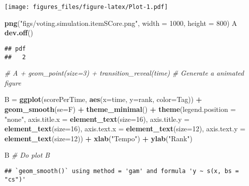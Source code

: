 \documentclass[]{article}
\newenvironment{Shaded}{\begin{snugshade}}{\end{snugshade}}
\newcommand{\CommentTok}[1]{\textcolor[rgb]{0.56,0.35,0.01}{\textit{#1}}}
\newcommand{\DataTypeTok}[1]{\textcolor[rgb]{0.13,0.29,0.53}{#1}}
\newcommand{\DecValTok}[1]{\textcolor[rgb]{0.00,0.00,0.81}{#1}}
\newcommand{\KeywordTok}[1]{\textcolor[rgb]{0.13,0.29,0.53}{\textbf{#1}}}
\newcommand{\NormalTok}[1]{#1}
\newcommand{\OperatorTok}[1]{\textcolor[rgb]{0.81,0.36,0.00}{\textbf{#1}}}
\newcommand{\StringTok}[1]{\textcolor[rgb]{0.31,0.60,0.02}{#1}}
\begin{document}
\texttt{[image: figures\_files/figure-latex/Plot-1.pdf]}

\begin{Shaded}
\begin{Highlighting}[]
\KeywordTok{png}\NormalTok{(}\StringTok{"figs/voting.simulation.itemSCore.png"}\NormalTok{, }\DataTypeTok{width =} \DecValTok{1000}\NormalTok{, }\DataTypeTok{height =} \DecValTok{800}\NormalTok{)}
\NormalTok{A}
\KeywordTok{dev.off}\NormalTok{()}
\end{Highlighting}
\end{Shaded}

\begin{verbatim}
## pdf 
##   2
\end{verbatim}

\begin{Shaded}
\begin{Highlighting}[]
\CommentTok{# A + geom_point(size=3) + transition_reveal(time) # Generate a animated figure}

\NormalTok{B =}\StringTok{ }\KeywordTok{ggplot}\NormalTok{(scorePerTime, }\KeywordTok{aes}\NormalTok{(}\DataTypeTok{x=}\NormalTok{time, }\DataTypeTok{y=}\NormalTok{rank, }\DataTypeTok{color=}\NormalTok{Tag)) }\OperatorTok{+}\StringTok{ }\KeywordTok{geom_smooth}\NormalTok{(}\DataTypeTok{se=}\NormalTok{F) }\OperatorTok{+}
\StringTok{  }\KeywordTok{theme_minimal}\NormalTok{() }\OperatorTok{+}\StringTok{ }\KeywordTok{theme}\NormalTok{(}\DataTypeTok{legend.position =} \StringTok{"none"}\NormalTok{, }\DataTypeTok{axis.title.x =} \KeywordTok{element_text}\NormalTok{(}\DataTypeTok{size=}\DecValTok{16}\NormalTok{),}
                          \DataTypeTok{axis.title.y =} \KeywordTok{element_text}\NormalTok{(}\DataTypeTok{size=}\DecValTok{16}\NormalTok{),}
                          \DataTypeTok{axis.text.x =} \KeywordTok{element_text}\NormalTok{(}\DataTypeTok{size=}\DecValTok{12}\NormalTok{),}
                          \DataTypeTok{axis.text.y =} \KeywordTok{element_text}\NormalTok{(}\DataTypeTok{size=}\DecValTok{12}\NormalTok{)) }\OperatorTok{+}
\StringTok{  }\KeywordTok{xlab}\NormalTok{(}\StringTok{"Tempo"}\NormalTok{) }\OperatorTok{+}\StringTok{ }\KeywordTok{ylab}\NormalTok{(}\StringTok{"Rank"}\NormalTok{)}

\NormalTok{B }\CommentTok{# Do plot B}
\end{Highlighting}
\end{Shaded}

\begin{verbatim}
## `geom_smooth()` using method = 'gam' and formula 'y ~ s(x, bs = "cs")'
\end{verbatim}
\end{document}

